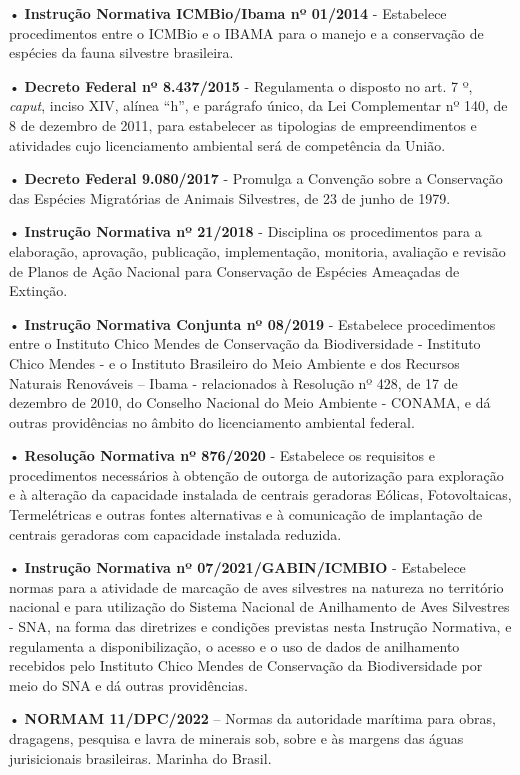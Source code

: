 \documentclass[
  oneside]{scrbook}
\begin{document}
• \textbf{Instrução Normativa ICMBio/Ibama nº 01/2014} - Estabelece procedimentos entre o ICMBio e o IBAMA para o manejo e a conservação de espécies da fauna silvestre brasileira.

• \textbf{Decreto Federal nº 8.437/2015} - Regulamenta o disposto no art. 7 º, \emph{caput}, inciso XIV, alínea ``h'', e parágrafo único, da Lei Complementar nº 140, de 8 de dezembro de 2011, para estabelecer as tipologias de empreendimentos e atividades cujo licenciamento ambiental será de competência da União.

• \textbf{Decreto Federal 9.080/2017} - Promulga a Convenção sobre a Conservação das Espécies Migratórias de Animais Silvestres, de 23 de junho de 1979.

• \textbf{Instrução Normativa nº 21/2018} - Disciplina os procedimentos para a elaboração, aprovação, publicação, implementação, monitoria, avaliação e revisão de Planos de Ação Nacional para Conservação de Espécies Ameaçadas de Extinção.

• \textbf{Instrução Normativa Conjunta nº 08/2019} - Estabelece procedimentos entre o Instituto Chico Mendes de Conservação da Biodiversidade - Instituto Chico Mendes - e o Instituto Brasileiro do Meio Ambiente e dos Recursos Naturais Renováveis -- Ibama - relacionados à Resolução nº 428, de 17 de dezembro de 2010, do Conselho Nacional do Meio Ambiente - CONAMA, e dá outras providências no âmbito do licenciamento ambiental federal.

• \textbf{Resolução Normativa nº 876/2020} - Estabelece os requisitos e procedimentos necessários à obtenção de outorga de autorização para exploração e à alteração da capacidade instalada de centrais geradoras Eólicas, Fotovoltaicas, Termelétricas e outras fontes alternativas e à comunicação de implantação de centrais geradoras com capacidade instalada reduzida.

• \textbf{Instrução Normativa nº 07/2021/GABIN/ICMBIO} - Estabelece normas para a atividade de marcação de aves silvestres na natureza no território nacional e para utilização do Sistema Nacional de Anilhamento de Aves Silvestres - SNA, na forma das diretrizes e condições previstas nesta Instrução Normativa, e regulamenta a disponibilização, o acesso e o uso de dados de anilhamento recebidos pelo Instituto Chico Mendes de Conservação da Biodiversidade por meio do SNA e dá outras providências.

• \textbf{NORMAM 11/DPC/2022} -- Normas da autoridade marítima para obras, dragagens, pesquisa e lavra de minerais sob, sobre e às margens das águas jurisicionais brasileiras. Marinha do Brasil.
\end{document}

